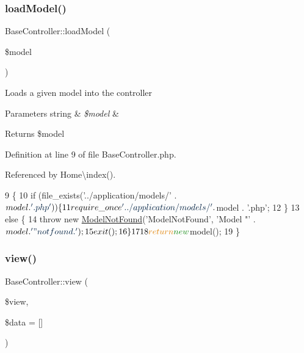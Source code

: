 \subsubsection{\texorpdfstring{load\+Model()}{loadModel()}}
{\footnotesize\ttfamily Base\+Controller\+::load\+Model (\begin{DoxyParamCaption}\item[{}]{\$model }\end{DoxyParamCaption})\hspace{0.3cm}{\ttfamily [protected]}}

Loads a given model into the controller


\begin{DoxyParams}[1]{Parameters}
string & {\em \$model} & \\
\hline
\end{DoxyParams}
\begin{DoxyReturn}{Returns}
\$model 
\end{DoxyReturn}


Definition at line 9 of file Base\+Controller.\+php.



Referenced by Home\textbackslash{}index().


\begin{DoxyCode}
9                                          \{
10         \textcolor{keywordflow}{if} (file\_exists(\textcolor{stringliteral}{'../application/models/'} . $model . \textcolor{stringliteral}{'.php'})) \{
11             require\_once \textcolor{stringliteral}{'../application/models/'} . $model . \textcolor{stringliteral}{'.php'};
12         \}
13         \textcolor{keywordflow}{else} \{
14             \textcolor{keywordflow}{throw} \textcolor{keyword}{new} \hyperlink{class_model_not_found}{ModelNotFound}(\textcolor{stringliteral}{'ModelNotFound'}, \textcolor{stringliteral}{'Model "'} . $model . \textcolor{stringliteral}{'" not found.'});
15             exit();
16         \}
17 
18         \textcolor{keywordflow}{return} \textcolor{keyword}{new} $model();
19     \}
\end{DoxyCode}
\hypertarget{class_base_controller_a2c835b7c72f07e978eac1f6ed2e9341e}{}\label{class_base_controller_a2c835b7c72f07e978eac1f6ed2e9341e} 
\subsubsection{\texorpdfstring{view()}{view()}}
{\footnotesize\ttfamily Base\+Controller\+::view (\begin{DoxyParamCaption}\item[{}]{\$view,  }\item[{}]{\$data = {\ttfamily \mbox{[}\mbox{]}} }\end{DoxyParamCaption})}

